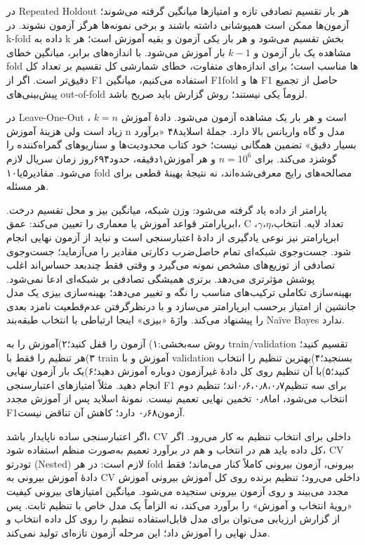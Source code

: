 در Repeated Holdout هر بار تقسیم تصادفی تازه و امتیازها میانگین گرفته می‌شوند؛ آزمون‌ها ممکن است همپوشانی داشته باشند و برخی نمونه‌ها هرگز آزمون نشوند. در k-fold داده به k بخش تقسیم می‌شود و هر بار یکی آزمون و بقیه آموزش است؛ هر مشاهده یک بار آزمون و $k-1$ بار آموزش می‌شود. با اندازه‌های برابر، میانگین خطای fold ها مناسب است؛ برای اندازه‌های متفاوت، خطای شمارشی کل تقسیم بر تعداد کل دقیق‌تر است. اگر از F1 استفاده می‌کنیم، میانگین F1fold ها و F1 حاصل از تجمیع پیش‌بینی‌های out-of-fold لزوماً یکی نیستند؛ روش گزارش باید صریح باشد.

در Leave-One-Out ، $k=n$ است و هر بار یک مشاهده آزمون می‌شود. دادهٔ آموزش زیاد است ولی هزینهٔ آموزش n مدل و گاه واریانس بالا دارد. جملهٔ اسلاید۴۸ «برآورد بسیار دقیق» تضمین همگانی نیست؛ خود کتاب محدودیت‌ها و سناریوهای گمراه‌کننده را گوشزد می‌کند. برای $n=10^6$ و هر آموزش۱دقیقه، حدود۶۹۴روز زمان سریال لازم می‌شود. مقادیر۵یا۱۰ fold مصالحه‌های رایج معرفی‌شده‌اند، نه نتیجهٔ بهینهٔ قطعی برای هر مسئله.

پارامتر از داده یاد گرفته می‌شود: وزن شبکه، میانگین بیز و محل تقسیم درخت. ابرپارامتر قواعد آموزش یا معماری را تعیین می‌کند: عمق، C ،$\gamma$،$\eta$،تعداد لایه. انتخاب ابرپارامتر نیز نوعی یادگیری از دادهٔ اعتبارسنجی است و نباید از آزمون نهایی انجام شود. جست‌وجوی شبکه‌ای تمام حاصل‌ضرب دکارتی مقادیر را می‌آزماید؛ جست‌وجوی تصادفی از توزیع‌های مشخص نمونه می‌گیرد و وقتی فقط چندبعد حساس‌اند اغلب پوشش مؤثرتری می‌دهد. برتری همیشگی تصادفی بر شبکه‌ای ادعا نمی‌شود. بهینه‌سازی تکاملی ترکیب‌های مناسب را نگه و تغییر می‌دهد؛ بهینه‌سازی بیزی یک مدل جانشین از امتیاز برحسب ابرپارامتر می‌سازد و با درنظرگرفتن عدم‌قطعیت نامزد بعدی را پیشنهاد می‌کند. واژهٔ «بیزی» اینجا ارتباطی با انتخاب طبقه‌بند Naïve Bayes ندارد.

روش سه‌بخشی:۱) آزمون را قفل کنید؛۲)آموزش را به train/validation تقسیم کنید؛۳)هر تنظیم را فقط با train آموزش و با validation بسنجید؛۴)بهترین تنظیم را انتخاب کنید؛۵)با آن تنظیم روی کل دادهٔ غیرآزمون دوباره آموزش دهید؛۶)یک بار آزمون نهایی انجام دهید. مثلاً امتیازهای اعتبارسنجی F1 برای سه تنظیم۰٫۶،۰٫۸،۰٫۷‌اند؛ تنظیم دوم انتخاب می‌شود، اما۰٫۸ تخمین نهایی تعمیم نیست. نمونهٔ اسلاید پس از آموزش مجدد F1آزمون۰٫۶۸ دارد؛ کاهش آن تناقض نیست.

اگر اعتبارسنجی ساده ناپایدار باشد، CV داخلی برای انتخاب تنظیم به کار می‌رود. اگر کل داده باید هم در انتخاب و هم در برآورد تعمیم به‌صورت منظم استفاده شود، CV تودرتو (Nested) لازم است: در هر fold بیرونی، آزمون بیرونی کاملاً کنار می‌ماند؛ فقط دادهٔ آموزش بیرونی به CV داخلی می‌رود؛ تنظیم برنده روی کل آموزش بیرونی آموزش مجدد می‌بیند و روی آزمون بیرونی سنجیده می‌شود. میانگین امتیازهای بیرونی کیفیت «رویهٔ انتخاب و آموزش» را برآورد می‌کند، نه الزاماً یک مدل خاص با تنظیم ثابت. پس از گزارش ارزیابی می‌توان برای مدل قابل‌استفاده تنظیم را روی کل داده انتخاب و مدل نهایی را آموزش داد؛ این مرحله آزمون تازه‌ای تولید نمی‌کند.

